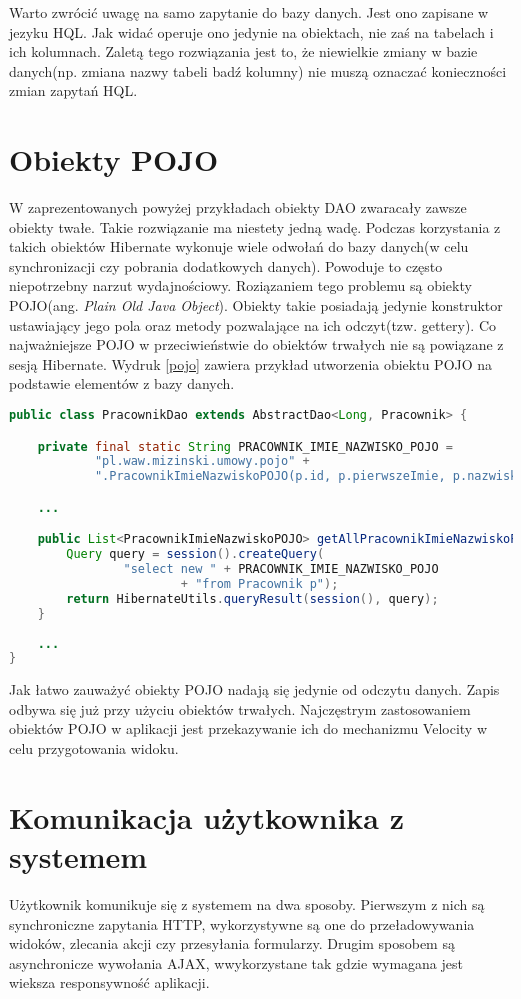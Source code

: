 Warto zwrócić uwagę na samo zapytanie do bazy danych. Jest ono zapisane w jezyku HQL. Jak widać operuje ono jedynie na obiektach, nie zaś na tabelach i ich kolumnach. Zaletą tego rozwiązania jest to, że niewielkie zmiany w bazie danych(np. zmiana nazwy tabeli badź kolumny) nie muszą oznaczać konieczności zmian zapytań HQL.

\section[Obiekty POJO][Obiekty POJO]{Obiekty POJO}
W zaprezentowanych powyżej przykładach obiekty DAO zwaracały zawsze obiekty twałe. Takie rozwiązanie ma niestety jedną wadę. Podczas korzystania z takich obiektów Hibernate wykonuje wiele odwołań do bazy danych(w celu synchronizacji czy pobrania dodatkowych danych). Powoduje to często niepotrzebny narzut wydajnościowy. Roziązaniem tego problemu są obiekty POJO(ang. \textit{Plain Old Java Object}). Obiekty takie posiadają jedynie konstruktor ustawiający jego pola oraz metody pozwalające na ich odczyt(tzw. gettery). Co najważniejsze POJO w przeciwieństwie do obiektów trwałych nie są powiązane z sesją Hibernate. Wydruk \ref{pojo} zawiera przykład utworzenia obiektu POJO na podstawie elementów z bazy danych.

\begin{lstlisting}[language=Java,style=outcode,showstringspaces=false,caption=Metoda DAO zwracająca listę obiektów POJO,label={pojo}]
public class PracownikDao extends AbstractDao<Long, Pracownik> {

	private final static String PRACOWNIK_IMIE_NAZWISKO_POJO = 
			"pl.waw.mizinski.umowy.pojo" +
			".PracownikImieNazwiskoPOJO(p.id, p.pierwszeImie, p.nazwisko)";

	...

	public List<PracownikImieNazwiskoPOJO> getAllPracownikImieNazwiskoPOJOs() {
		Query query = session().createQuery(
				"select new " + PRACOWNIK_IMIE_NAZWISKO_POJO
						+ "from Pracownik p");
		return HibernateUtils.queryResult(session(), query);
	}
	
	...
}
\end{lstlisting}

Jak łatwo zauważyć obiekty POJO nadają się jedynie od odczytu danych. Zapis odbywa się już przy użyciu obiektów trwałych. Najczęstrym zastosowaniem obiektów POJO w aplikacji jest przekazywanie ich do mechanizmu Velocity w celu przygotowania widoku.

\section[Komunikacja użytkownika z systemem][Komunikacja użytkownika z systemem]{Komunikacja użytkownika z systemem}
Użytkownik komunikuje się z systemem na dwa sposoby. Pierwszym z nich są synchroniczne zapytania HTTP, wykorzystywne są one do przeładowywania widoków, zlecania akcji czy przesyłania formularzy. Drugim sposobem są asynchronicze wywołania AJAX, wwykorzystane tak gdzie wymagana jest wieksza responsywność aplikacji.

